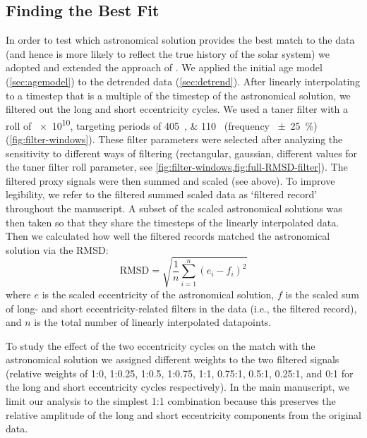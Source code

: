 \documentclass[draft]{agujournal2019}
\begin{document}
\subsection{Finding the Best Fit}\label{sec:algorithm}

In order to test which astronomical solution provides the best match to the data
(and hence is more likely to reflect the true history of the solar system)
we adopted and extended the approach of .
We applied the initial age model (\cref{sec:agemodel}) to the detrended data (\cref{sec:detrend}).
After linearly interpolating to a timestep that is a multiple of the timestep of the astronomical solution,
we filtered out the long and short eccentricity cycles.
We used a taner filter with a roll of \num{e10}, targeting periods of \qtylist{405;110}{\kiloyear} (frequency \qty{\pm25}{\percent}) (\cref{fig:filter-windows}).
These filter parameters were selected after analyzing the sensitivity to different ways of filtering (rectangular, gaussian, different values for the taner filter roll parameter, see \cref{fig:filter-windows,fig:full-RMSD-filter}).
The filtered proxy signals were then summed and scaled (see above).
To improve legibility, we refer to the filtered summed scaled data as `filtered record' throughout the manuscript.
A subset of the scaled astronomical solutions was then taken so that they share the timesteps of the linearly interpolated data.
Then we calculated how well the filtered records matched the astronomical solution via the \gls{RMSD}:
\begin{equation}\label{eqn:rmsd}
    \text{RMSD} = \sqrt{\frac{1}{n}\sum_{i=1}^{n}(e_{i} - f_{i})^{2}}
\end{equation}
where \(e\) is the scaled eccentricity of the astronomical solution, \(f\) is the scaled sum of long- and short eccentricity-related filters in the data (i.e., the filtered record), and \(n\) is the total number of linearly interpolated datapoints.

To study the effect of the two eccentricity cycles on the match with the astronomical solution
we assigned different weights to the two filtered signals
(relative weights of 1:0, 1:0.25, 1:0.5, 1:0.75, 1:1, 0.75:1, 0.5:1, 0.25:1, and 0:1 for the long and short eccentricity cycles respectively).
In the main manuscript, we limit our analysis to the simplest 1:1 combination because this preserves the relative amplitude of the long and short eccentricity components from the original data.
\end{document}
